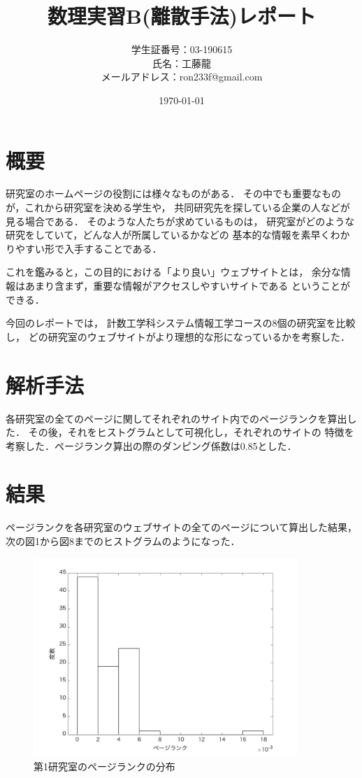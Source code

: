 \documentclass[10pt]{jarticle}
\title{数理実習B(離散手法)レポート}
\author{学生証番号：03-190615\\氏名：工藤龍\\メールアドレス：ron233f@gmail.com}
\date{\today}
\begin{document}
\maketitle

\section{概要}
研究室のホームページの役割には様々なものがある．
その中でも重要なものが，これから研究室を決める学生や，
共同研究先を探している企業の人などが見る場合である．
そのような人たちが求めているものは，
研究室がどのような研究をしていて，どんな人が所属しているかなどの
基本的な情報を素早くわかりやすい形で入手することである．

これを鑑みると，この目的における「より良い」ウェブサイトとは，
余分な情報はあまり含まず，重要な情報がアクセスしやすいサイトである
ということができる．

今回のレポートでは，
計数工学科システム情報工学コースの8個の研究室を比較し，
どの研究室のウェブサイトがより理想的な形になっているかを考察した．

\section{解析手法}
各研究室の全てのページに関してそれぞれのサイト内でのページランクを算出した．
その後，それをヒストグラムとして可視化し，それぞれのサイトの
特徴を考察した．ページランク算出の際のダンピング係数は0.85とした．

\section{結果}
ページランクを各研究室のウェブサイトの全てのページについて算出した結果，
次の図1から図8までのヒストグラムのようになった．

\begin{figure}[H]
  \begin{center}
  \includegraphics[width=10cm]{../histograms/i1.png}
  \caption{第1研究室のページランクの分布}
  \end{center}
\end{figure}
\end{document}
